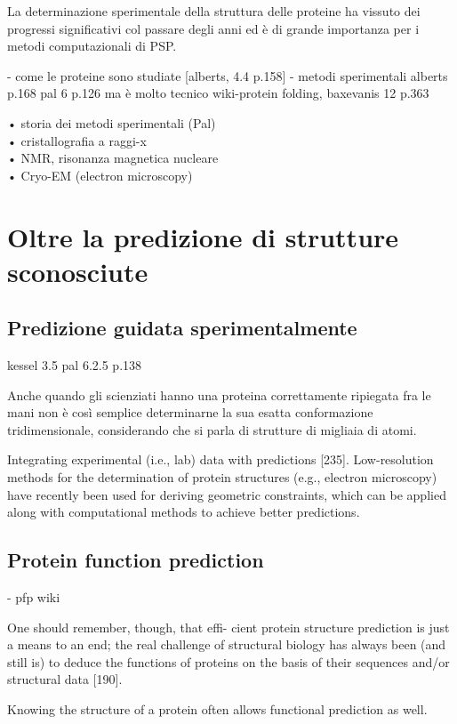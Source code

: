 La determinazione sperimentale della struttura delle proteine ha vissuto dei progressi significativi col passare degli anni ed è di grande importanza per i metodi computazionali di PSP.


- come le proteine sono studiate [alberts, 4.4 p.158]
- metodi sperimentali 
alberts p.168
pal 6 p.126 ma è molto tecnico
wiki-protein folding, 
baxevanis 12 p.363

• storia dei metodi sperimentali (Pal) \\
• cristallografia a raggi-x \\
• NMR, risonanza magnetica nucleare \\
• Cryo-EM (electron microscopy) \\

\section{Oltre la predizione di strutture sconosciute}

\subsection{Predizione guidata sperimentalmente}
kessel 3.5
pal 6.2.5 p.138

Anche quando gli scienziati hanno una proteina correttamente ripiegata fra le mani non è così semplice determinarne la sua esatta conformazione tridimensionale, considerando che si parla di strutture di migliaia di atomi.

Integrating experimental (i.e., lab) data with predictions [235]. Low-resolution
methods for the determination of protein structures (e.g., electron microscopy) have
recently been used for deriving geometric constraints, which can be applied along
with computational methods to achieve better predictions.

\subsection{Protein function prediction}
- pfp wiki

One should remember, though, that effi-
cient protein structure prediction is just a means to an end; the real challenge of structural
biology has always been (and still is) to deduce the functions of proteins on the basis of their
sequences and/or structural data [190].

Knowing the structure of a protein often allows functional prediction as well.

